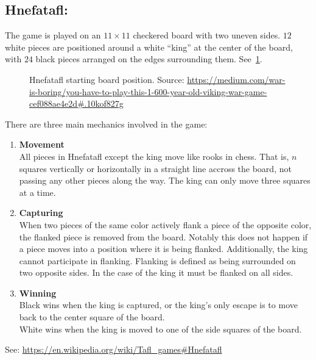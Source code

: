 \documentclass[11pt, oneside]{article}
\begin{document}
\subsection{Hnefatafl:}
The game is played on an $11\times 11$ checkered board with two uneven sides.
$12$ white pieces are positioned around a white ``king'' at the center of the
board, with $24$ black pieces arranged on the edges surrounding them.
See~\ref{fig:initial_position}.
\begin{figure}
  \label{fig:initial_position}
  \centering
    \caption{Hnefatafl starting board position. Source: \url{https://medium.com/war-is-boring/you-have-to-play-this-1-600-year-old-viking-war-game-cef088ae4e2d\#.10kof827g}}
\end{figure}
There are three main mechanics involved in the game: 
\begin{enumerate}
\item \textbf{Movement}\\
  All pieces in Hnefatafl except the king move like rooks in chess. That is, $n$
  squares vertically or horizontally in a straight line accross the board, not
  passing any other pieces along the way. The king can only move three squares
  at a time.
\item \textbf{Capturing}\\
  When two pieces of the same color actively flank a piece of the opposite
  color, the flanked piece is removed from the board. Notably this does not
  happen if a piece moves into a position where it is being flanked.
  Additionally, the king cannot participate in flanking. Flanking is defined as
  being surrounded on two opposite sides. In the case of the king it must be
  flanked on all sides.
\item \textbf{Winning}\\
  Black wins when the king is captured, or the king's only escape is to move
  back to the center square of the board.\\
  White wins when the king is moved to one of the side squares of the board.
\end{enumerate}
See: \url{https://en.wikipedia.org/wiki/Tafl\_games\#Hnefatafl}
\end{document}
